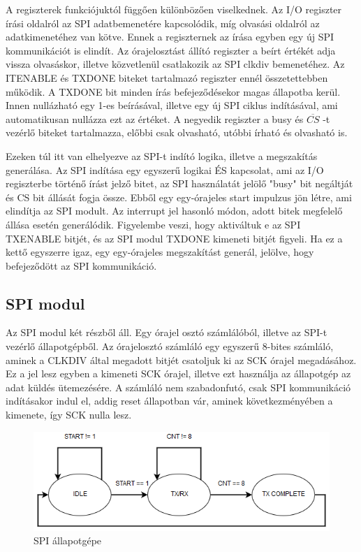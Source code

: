 \documentclass[a4paper,11pt]{article}
\begin{document}
A regiszterek funkciójuktól függően különbözően viselkednek. Az I/O regiszter írási oldalról az SPI adatbemenetére kapcsolódik, míg olvasási oldalról az adatkimenetéhez van kötve. Ennek a regiszternek az írása egyben egy új SPI kommunikációt is elindít. Az órajelosztást állító regiszter a beírt értékét adja vissza olvasáskor, illetve közvetlenül csatlakozik az SPI clkdiv bemenetéhez. Az ITENABLE és TXDONE biteket tartalmazó regiszter ennél összetettebben működik. A TXDONE bit minden írás befejeződésekor magas állapotba kerül. Innen nullázható egy 1-es beírásával, illetve egy új SPI ciklus indításával, ami automatikusan nullázza ezt az értéket. A negyedik regiszter a busy és $\overline{CS}$ -t vezérlő biteket tartalmazza, előbbi csak olvasható, utóbbi írható és olvasható is.

Ezeken túl itt van elhelyezve az SPI-t indító logika, illetve a megszakítás generálása. Az SPI indítása egy egyszerű logikai ÉS kapcsolat, ami az I/O regiszterbe történő írást jelző bitet, az SPI használatát jelölő "busy" bit negáltját és CS bit állását fogja össze. Ebből egy egy-órajeles start impulzus jön létre, ami elindítja az SPI modult. Az interrupt jel hasonló módon, adott bitek megfelelő állása esetén generálódik. Figyelembe veszi, hogy aktiváltuk e az SPI TX\textunderscore ENABLE bitjét, és az SPI modul TXDONE kimeneti bitjét figyeli. Ha ez a kettő egyszerre igaz, egy egy-órajeles megszakítást generál, jelölve, hogy befejeződött az SPI kommunikáció.

\subsection{SPI modul}
Az SPI modul két részből áll. Egy órajel osztó számlálóból, illetve az SPI-t vezérlő állapotgépből. Az órajelosztó számláló egy egyszerű 8-bites számláló, aminek a CLKDIV által megadott bitjét csatoljuk ki az SCK órajel megadásához. Ez a jel lesz egyben a kimeneti SCK órajel, illetve ezt használja az állapotgép az adat küldés ütemezésére. A számláló nem szabadonfutó, csak SPI kommunikáció indításakor indul el, addig reset állapotban vár, aminek következményében a kimenete, így SCK nulla lesz.

\begin{figure}[H]
	\begin{center}
	\includegraphics[scale=0.6]{spi_statemachine.png}
	\caption{SPI állapotgépe}
	\label{fig:spistatemchn}
	\end{center}
\end{figure}
\end{document}
